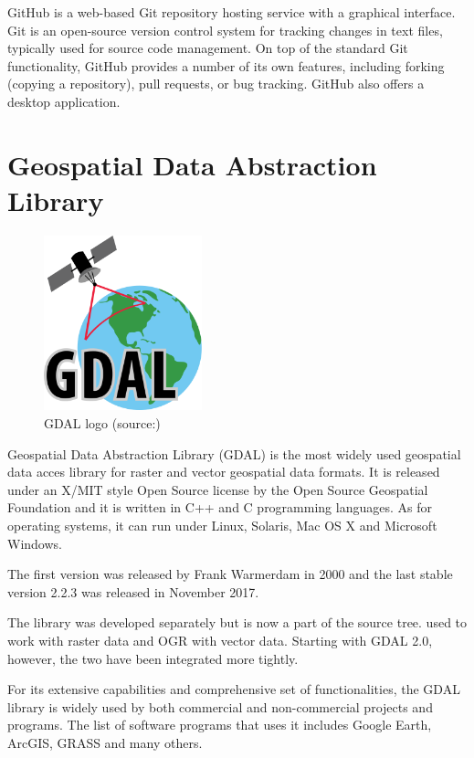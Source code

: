   GitHub is a web-based Git repository hosting service with a
  graphical interface. Git is an open-source version control system
  for tracking changes in text files, typically used for source code
  management.\cite{git} On top of the standard Git functionality,
  GitHub provides a number of its own features, including forking
  (copying a repository), pull requests, or bug tracking. GitHub also
  offers a desktop application.

\section{Geospatial Data Abstraction Library}

\begin{figure}[H] \centering
      \includegraphics[width=130pt]{./pictures/gdal.png}
      \caption[GDAL logo]{GDAL logo (source:{\cite{gdal}})}
      \label{fig:GDAL}
  \end{figure}

  Geospatial Data Abstraction Library (GDAL) is the most widely
  used geospatial data acces library for raster and vector geospatial
  data formats. It is released under an X/MIT style Open Source
  license by the Open Source Geospatial Foundation and it is written
  in C++ and C programming languages. As for operating systems, it can
  run under Linux, Solaris, Mac OS X and Microsoft Windows.\cite{gdal}

  The first version was released by Frank Warmerdam in 2000 and the
  last stable version 2.2.3 was released in November
  2017.\cite{gdalrelease}


  The  library was developed separately but is now a part of
  the  source tree.  used to work with raster data
  and OGR with vector data. Starting with GDAL 2.0, however, the two
  have been integrated more tightly.

  For its extensive capabilities and comprehensive set of
  functionalities, the GDAL library is widely used by both
  commercial and non-commercial  projects and programs. The
  list of software programs that uses it includes Google Earth,
  ArcGIS, GRASS  and many others.\cite{gdalogr}

